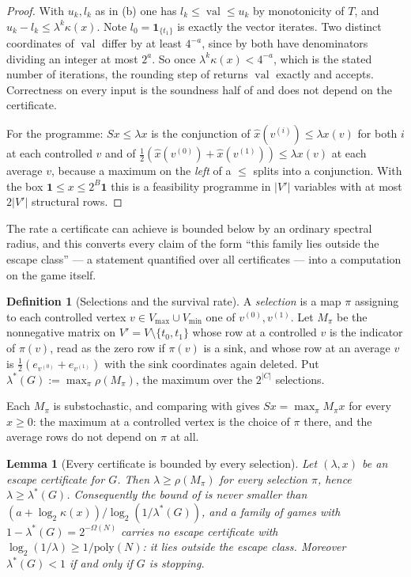 \documentclass[11pt]{article}
\theoremstyle{plain}
\newtheorem{lemma}[theorem]{Lemma}
\theoremstyle{definition}
\newtheorem{definition}[theorem]{Definition}
\DeclareMathOperator{\val}{val}
\newcommand{\Vmax}{V_{\max}}
\newcommand{\Vmin}{V_{\min}}
\newcommand{\bbone}{\mathbf{1}}
\begin{document}
\begin{proof}
With $u_k,l_k$ as in (b) one has
$l_k\le\val\le u_k$ by monotonicity of $T$, and
$u_k-l_k\le\lambda^k\kappa(x)$. Note $l_0=\bbone_{\{t_1\}}$ is exactly
the vector  iterates. Two distinct
coordinates of $\val$ differ by at least $4^{-a}$, since by
 both have denominators dividing an integer
at most $2^{a}$. So once $\lambda^k\kappa(x)<4^{-a}$, which is the stated
number of iterations, the rounding step of  returns
$\val$ exactly and  accepts. Correctness on every
input is the soundness half of  and does not depend
on the certificate.

For the programme: $Sx\le\lambda x$ is the conjunction of
$\hat x(v^{(i)})\le\lambda x(v)$ for both $i$ at each controlled $v$ and
of $\tfrac12(\hat x(v^{(0)})+\hat x(v^{(1)}))\le\lambda x(v)$ at each
average $v$, because a maximum on the \emph{left} of a $\le$ splits into
a conjunction. With the box $\bbone\le x\le2^{B}\bbone$ this is a
feasibility programme in $|V'|$ variables with at most $2|V'|$ structural
rows.
\end{proof}

The rate a certificate can achieve is bounded below by an ordinary
spectral radius, and this converts every claim of the form ``this family
lies outside the escape class'' --- a statement quantified over all
certificates --- into a computation on the game itself.

\begin{definition}[Selections and the survival rate]\label{def:survival-rate}
A \emph{selection} is a map $\pi$ assigning to each controlled vertex
$v\in\Vmax\cup\Vmin$ one of $v^{(0)},v^{(1)}$. Let $M_\pi$ be the
nonnegative matrix on $V'=V\setminus\{t_0,t_1\}$ whose row at a controlled
$v$ is the indicator of $\pi(v)$, read as the zero row if $\pi(v)$ is a
sink, and whose row at an average $v$ is
$\tfrac12(e_{v^{(0)}}+e_{v^{(1)}})$ with the sink coordinates again
deleted. Put $\lambda^{\ast}(G):=\max_\pi\rho(M_\pi)$, the maximum over the
$2^{|C|}$ selections.
\end{definition}

Each $M_\pi$ is substochastic, and comparing  with
 gives $Sx=\max_\pi M_\pi x$ for every $x\ge0$:
the maximum at a controlled vertex is the choice of $\pi$ there, and the
average rows do not depend on $\pi$ at all.

\begin{lemma}[Every certificate is bounded by every selection]\label{lem:escape-rate}
Let $(\lambda,x)$ be an escape certificate for $G$. Then
$\lambda\ge\rho(M_\pi)$ for \emph{every} selection $\pi$, hence
$\lambda\ge\lambda^{\ast}(G)$. Consequently the bound of
 is never smaller than
$(a+\log_2\kappa(x))/\log_2(1/\lambda^{\ast}(G))$, and a family of games with
$1-\lambda^{\ast}(G)=2^{-\Omega(N)}$ carries no escape certificate with
$\log_2(1/\lambda)\ge1/\mathrm{poly}(N)$: it lies outside the escape
class. Moreover $\lambda^{\ast}(G)<1$ if and only if $G$ is stopping.
\end{lemma}
\end{document}
